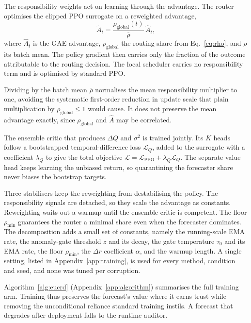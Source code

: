 \documentclass{article} %
\begin{document}
The responsibility weights act on learning through the advantage. The router optimises the clipped PPO surrogate on a reweighted advantage,
\begin{equation}
\tilde{A}_t = \frac{\rho_{\text{global}}(t)}{\bar{\rho}}\,\hat{A}_t,
\label{eq:reweight}
\end{equation}
where $\hat{A}_t$ is the GAE advantage, $\rho_{\text{global}}$ the routing share from Eq.~\ref{eq:rho}, and $\bar{\rho}$ its batch mean. The policy gradient then carries only the fraction of the outcome attributable to the routing decision. The local scheduler carries no responsibility term and is optimised by standard PPO.

Dividing by the batch mean $\bar{\rho}$ normalises the mean responsibility multiplier to one, avoiding the systematic first-order reduction in update scale that plain multiplication by $\rho_{\text{global}}\le1$ would cause. It does not preserve the mean advantage exactly, since $\rho_{\text{global}}$ and $\hat{A}$ may be correlated.

The ensemble critic that produces $\Delta Q$ and $\sigma^2$ is trained jointly. Its $K$ heads follow a bootstrapped temporal-difference loss $\mathcal{L}_Q$, added to the surrogate with a coefficient $\lambda_Q$ to give the total objective $\mathcal{L}=\mathcal{L}_{\text{PPO}}+\lambda_Q\mathcal{L}_Q$. The separate value head keeps learning the unbiased return, so quarantining the forecaster share never biases the bootstrap targets.

Three stabilisers keep the reweighting from destabilising the policy. The responsibility signals are detached, so they scale the advantage as constants. Reweighting waits out a warmup until the ensemble critic is competent. The floor $\rho_{\min}$ guarantees the router a minimal share even when the forecaster dominates. The decomposition adds a small set of constants, namely the running-scale EMA rate, the anomaly-gate threshold $z$ and its decay, the gate temperature $\tau_0$ and its EMA rate, the floor $\rho_{\min}$, the $\Delta r$ coefficient $\alpha$, and the warmup length. A single setting, listed in Appendix~\ref{app:training}, is used for every method, condition and seed, and none was tuned per corruption.

Algorithm~\ref{alg:eucrd} (Appendix~\ref{app:algorithm}) summarises the full training arm. Training thus preserves the forecast's value where it earns trust while removing the unconditional reliance standard training instils. A forecast that degrades after deployment falls to the runtime auditor.
\end{document}
